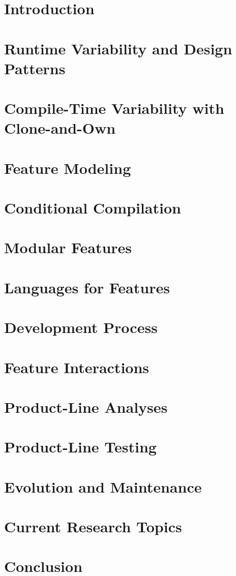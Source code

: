 \documentclass[
	aspectratio=169, %
	8pt, %
	handout, %
]{beamer}
\subtitle{Lecture Topics}
\author{Thomas Thüm, Timo Kehrer, Elias Kuiter}
\newcommand{\addlecture}[2]{\section{#2}\begin{frame}\end{frame}}
\begin{document}
	
\contentoverview
\usebackgroundtemplate{}
\AtBeginSection[]{}

\addlecture{01-introduction}{Introduction}
\addlecture{02-runtime}{Runtime Variability and Design Patterns}
\addlecture{03-cloneandown}{Compile-Time Variability with Clone-and-Own}
\sectionend

\addlecture{04-modeling}{Feature Modeling}
\addlecture{05-conditional}{Conditional Compilation}
\addlecture{06-modular}{Modular Features}
\addlecture{07-languages}{Languages for Features}
\addlecture{08-process}{Development Process}
\sectionend

\addlecture{09-interactions}{Feature Interactions}
\addlecture{10-analyses}{Product-Line Analyses}
\addlecture{11-testing}{Product-Line Testing}
\addlecture{12-evonance}{Evolution and Maintenance}
\sectionend

\addlecture{13-advanced}{Current Research Topics} %
\addlecture{14-conclusion}{Conclusion} %
\end{document}
